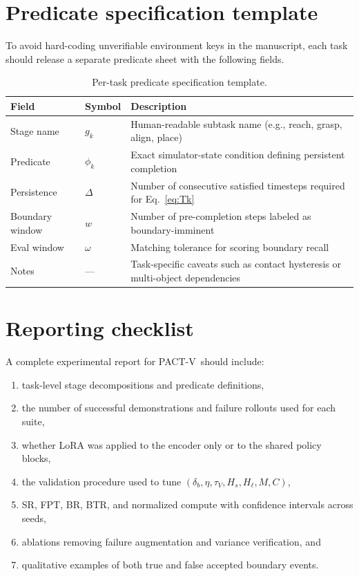 \documentclass[10pt]{article}
\newcommand{\method}{\textsc{PACT-V}\xspace}
\newcommand{\Hs}{H_s}
\newcommand{\Hl}{H_\ell}
\newcommand{\Msamples}{M}
\begin{document}
\appendix

\section{Predicate specification template}
\label{app:predicates}

To avoid hard-coding unverifiable environment keys in the manuscript, each task
should release a separate predicate sheet with the following fields.

\begin{table}[h]
\centering
\caption{Per-task predicate specification template.}
\label{tab:predicate_template}
\begin{tabular}{p{2.1cm}p{2.0cm}p{6.4cm}}
\toprule
Field & Symbol & Description \\
\midrule
Stage name & $g_k$ & Human-readable subtask name (e.g., reach, grasp, align, place) \\
Predicate & $\phi_k$ & Exact simulator-state condition defining persistent completion \\
Persistence & $\Delta$ & Number of consecutive satisfied timesteps required for Eq.~\eqref{eq:Tk} \\
Boundary window & $w$ & Number of pre-completion steps labeled as boundary-imminent \\
Eval window & $\omega$ & Matching tolerance for scoring boundary recall \\
Notes & --- & Task-specific caveats such as contact hysteresis or multi-object dependencies \\
\bottomrule
\end{tabular}
\end{table}

\section{Reporting checklist}
\label{app:reporting}

A complete experimental report for \method\ should include:
\begin{enumerate}[leftmargin=1.5em, itemsep=0.15em]
  \item task-level stage decompositions and predicate definitions,
  \item the number of successful demonstrations and failure rollouts used for each suite,
  \item whether LoRA was applied to the encoder only or to the shared policy blocks,
  \item the validation procedure used to tune $(\delta_b,\eta,\tau_V,\Hs,\Hl,\Msamples,C)$,
  \item SR, FPT, BR, BTR, and normalized compute with confidence intervals across seeds,
  \item ablations removing failure augmentation and variance verification, and
  \item qualitative examples of both true and false accepted boundary events.
\end{enumerate}
\end{document}
